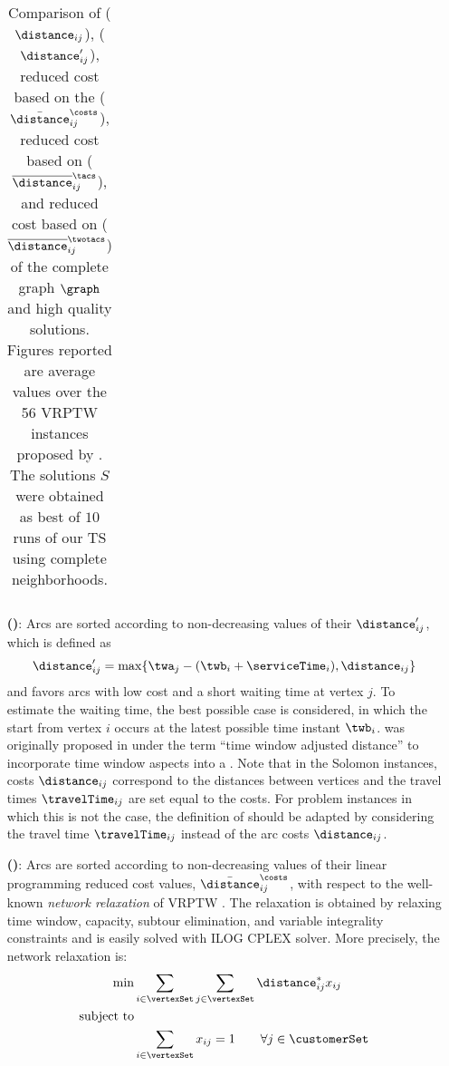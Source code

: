 \documentclass[11pt,a4paper,fleqn]{article}
\begin{document}
\begin{itemize}
\begin{table}[htbp]
\begin{tabular}{@{}lcrrcrrcrrcrrcrr@{}}
\bottomrule
\end{tabular}
\caption{Comparison of \cost ($\distance_{ij}$), \tac ($\distance'_{ij}$), reduced cost based on the \nrc ($\bar{\distance}_{ij}^{\mathit{\costs}}$), reduced cost based on \nrtac ($\overline{\distance}_{ij}^{\mathit{\tacs}}$), and  reduced cost based on \nrtwotac ($\overline{\distance}_{ij}^{\mathit{\twotacs}}$) of the complete graph $\graph$ and high quality solutions. Figures reported are average values over the 56 VRPTW instances proposed by \citet{solomon:87}. The solutions $S$ were obtained as best of $10$ runs of our TS using complete neighborhoods.}
\label{t:arc_length_solutions}
\end{table}
%
\item[\textbf{\tacf (\tacs)}:] Arcs are sorted according to non-decreasing values of their \tacs $\distance'_{ij}$, which is defined as
\begin{equation*} \distance'_{ij} = \max \{ \twa_j - (\twb_i + \serviceTime_i), \distance_{ij} \} \end{equation*}
and favors arcs with low cost and a short waiting time at vertex $j$. To estimate the waiting time, the best possible case is considered, in which the start from vertex $i$ occurs at the latest possible time instant $\twb_i$. \tacs was originally proposed in \citet{doppstadt:10} under the term ``time window adjusted distance''  to incorporate time window aspects into a \sm. Note that in the Solomon instances, costs $\distance_{ij}$ correspond to the distances between vertices and the travel times $\travelTime_{ij}$ are set equal to the costs. For problem instances in which this is not the case, the definition of \tacs should be adapted by considering the travel time $\travelTime_{ij}$ instead of the arc costs $\distance_{ij}$. 
%
\item [\textbf{\nrcf (\nrcs)}:] Arcs are sorted according to non-decreasing values of their linear programming reduced cost values, $\bar{\distance}_{ij}^{\mathit{\costs}}$, with respect to the well-known \textit{network relaxation} of VRPTW \citep[see, e.g.,][]{cordeau:02:vrp}. The relaxation is obtained by relaxing time window, capacity, subtour elimination, and variable integrality constraints and is easily solved with ILOG CPLEX solver. More precisely, the network relaxation is:
\begin{align}
\min & \sum_{i \in \vertexSet} \sum_{j \in \vertexSet} \distance^*_{ij} x_{ij} \\
\text{subject to} \nonumber \\
& \sum_{i \in \vertexSet} x_{ij} = 1 \qquad \forall j \in \customerSet \\

\end{align}
\end{itemize}
\end{document}
